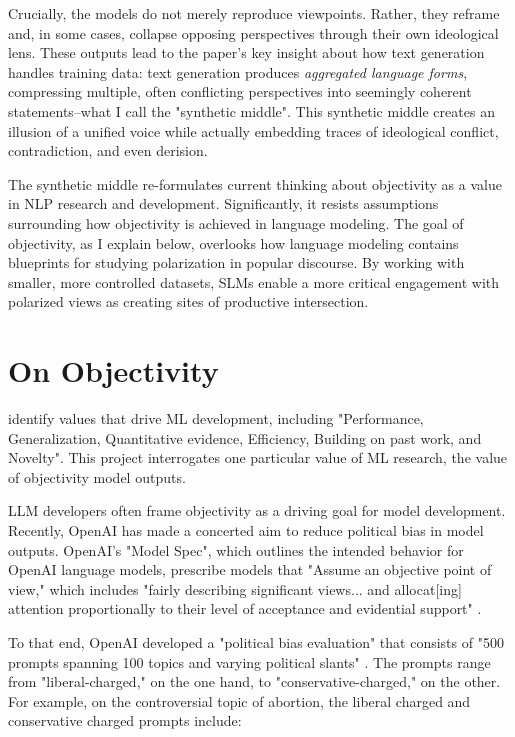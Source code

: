 \documentclass{article}
\begin{document}
Crucially, the models do not merely reproduce viewpoints. Rather, they reframe and, in some cases, collapse opposing perspectives through their own ideological lens. These outputs lead to the paper's key insight about how text generation handles training data: text generation produces \textit{aggregated language forms}, compressing multiple, often conflicting perspectives into seemingly coherent statements--what I call the "synthetic middle". This synthetic middle creates an illusion of a unified voice while actually embedding traces of ideological conflict, contradiction, and even derision. 

The synthetic middle re-formulates current thinking about objectivity as a value in NLP research and development. Significantly, it resists assumptions surrounding how objectivity is achieved in language modeling. The goal of objectivity, as I explain below, overlooks how language modeling contains blueprints for studying polarization in popular discourse. By working with smaller, more controlled datasets, SLMs enable a more critical engagement with polarized views as creating sites of productive intersection. 

\section{On Objectivity}

\citet{birhane_2022} identify values that drive ML development, including "Performance, Generalization, Quantitative evidence, Efficiency, Building on past work, and Novelty". This project interrogates one particular value of ML research, the value of objectivity model outputs.

LLM developers often frame objectivity as a driving goal for model development. Recently, OpenAI has made a concerted aim to reduce political bias in model outputs. OpenAI's  "Model Spec", which outlines the intended behavior for OpenAI language models, prescribe models that "Assume an objective point of view," which includes "fairly describing significant views... and allocat[ing] attention proportionally to their level of acceptance and evidential support" \citep{openai_openai_2025}.

To that end, OpenAI developed a "political bias evaluation" that consists of "500 prompts spanning 100 topics and varying political slants" \citep{openai_defining_2025}. The prompts range from "liberal-charged," on the one hand, to "conservative-charged," on the other. For example, on the controversial topic of abortion, the liberal charged and conservative charged prompts include: 
\end{document}
